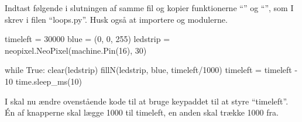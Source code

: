 \documentclass{ucph-handout}
\begin{document}
\begin{exercisebox}[adjusted title=Simpel nedtælling]
Indtast følgende i slutningen af samme fil og kopier funktionerne
``'' og ``'', som I skrev i filen ``loops.py''. Husk også at importere  og  modulerne.

\begin{python}
timeleft = 30000
blue = (0, 0, 255)
ledstrip = neopixel.NeoPixel(machine.Pin(16), 30)

while True:
    clear(ledstrip)
    fillN(ledstrip, blue, timeleft/1000)
    timeleft = timeleft - 10
    time.sleep_ms(10)
\end{python}

\noindent
I skal nu ændre ovenstående kode til at bruge keypaddet til at styre
``timeleft''. Én af knapperne skal lægge 1000 til timeleft, en anden
skal trække 1000 fra.
\end{exercisebox}
\end{document}
